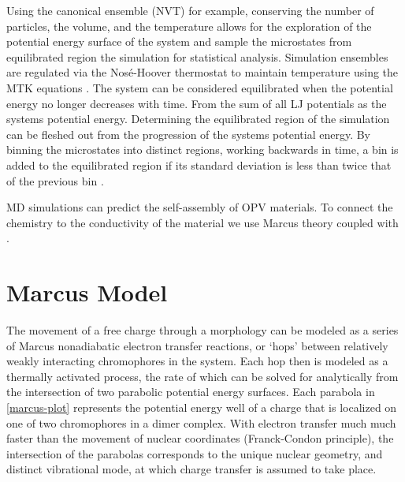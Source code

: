 Using the canonical ensemble (NVT) for example, conserving the number of
particles, the volume, and the temperature allows for the exploration of the potential energy surface
of the system and sample the microstates from equilibrated region the simulation for statistical analysis.  
Simulation ensembles are regulated via the Nos\'{e}-Hoover thermostat \cite{Hoover1985} to maintain 
temperature using the MTK equations \cite{Martyna1994d}\cite{Cao1996}.
The system can be considered equilibrated when the potential energy no longer decreases with time. 
From the sum of all LJ potentials as the systems potential energy. Determining the equilibrated region of the
simulation can be fleshed out from the progression of the systems potential energy. By binning the microstates
into distinct regions, working backwards in time, a bin is added to the equilibrated region if its standard
deviation is less than twice that of the previous bin \cite{Henry2017a}.

MD simulations can predict the self-assembly of OPV materials. To connect the chemistry to the
conductivity of the material we use Marcus theory coupled with .

\section{Marcus Model}
\label{marcusmodel}

The movement of a free charge through a morphology can be modeled as a series of 
Marcus nonadiabatic electron transfer
reactions, or `hops' between relatively weakly interacting chromophores in the system. 
Each hop then is modeled as a thermally activated process, the rate of which can be solved for analytically
from the intersection of two parabolic potential energy surfaces. 
Each parabola in \autoref{marcus-plot} represents the potential energy well of a charge that is localized on
one of two chromophores in a dimer complex. 
With electron transfer much much faster than the movement of nuclear coordinates (Franck-Condon principle),
the intersection of the parabolas corresponds to the unique nuclear geometry, and distinct vibrational mode, at
which charge transfer is assumed to take place. 

